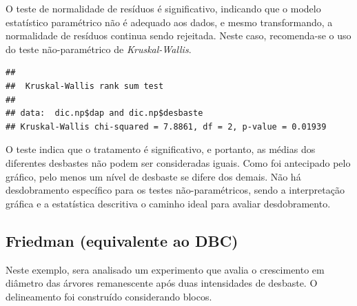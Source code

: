 \documentclass[
]{article}
\newenvironment{Shaded}{\begin{snugshade}}{\end{snugshade}}
\newcommand{\KeywordTok}[1]{\textcolor[rgb]{0.13,0.29,0.53}{\textbf{#1}}}
\newcommand{\NormalTok}[1]{#1}
\newcommand{\OperatorTok}[1]{\textcolor[rgb]{0.81,0.36,0.00}{\textbf{#1}}}
\begin{document}
O teste de normalidade de resíduos é significativo, indicando que o modelo estatístico paramétrico não é adequado aos dados, e mesmo transformando, a normalidade de resíduos continua sendo rejeitada. Neste caso, recomenda-se o uso do teste não-paramétrico de \emph{Kruskal-Wallis}.

\begin{Shaded}
\end{Shaded}

\begin{verbatim}
## 
##  Kruskal-Wallis rank sum test
## 
## data:  dic.np$dap and dic.np$desbaste
## Kruskal-Wallis chi-squared = 7.8861, df = 2, p-value = 0.01939
\end{verbatim}

O teste indica que o tratamento é significativo, e portanto, as médias dos diferentes desbastes não podem ser consideradas iguais. Como foi antecipado pelo gráfico, pelo menos um nível de desbaste se difere dos demais. Não há desdobramento específico para os testes não-paramétricos, sendo a interpretação gráfica e a estatística descritiva o caminho ideal para avaliar desdobramento.

\hypertarget{friedman-equivalente-ao-dbc}{%
\subsection{Friedman (equivalente ao DBC)}\label{friedman-equivalente-ao-dbc}}

Neste exemplo, sera analisado um experimento que avalia o crescimento em diâmetro das árvores remanescente após duas intensidades de desbaste. O delineamento foi construído considerando blocos.
\end{document}
